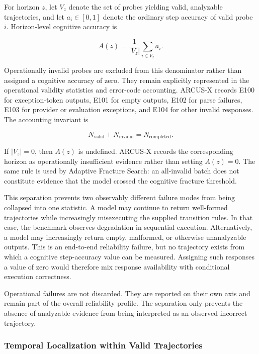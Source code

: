 \documentclass{article}
\begin{document}
For horizon $z$, let $V_z$ denote the set of probes yielding valid,
analyzable trajectories, and let $a_i \in [0,1]$ denote the ordinary step
accuracy of valid probe $i$. Horizon-level cognitive accuracy is

\begin{equation}
    A(z)
    =
    \frac{1}{|V_z|}
    \sum_{i \in V_z} a_i.
    \label{eq:conditional_accuracy}
\end{equation}

Operationally invalid probes are excluded from this denominator rather than
assigned a cognitive accuracy of zero. They remain explicitly represented in
the operational validity statistics and error-code accounting. ARCUS-X records
E100 for exception-token outputs, E101 for empty outputs, E102 for parse
failures, E103 for provider or evaluation exceptions, and E104 for other
invalid responses. The accounting invariant is

\begin{equation}
    N_{\mathrm{valid}} + N_{\mathrm{invalid}}
    =
    N_{\mathrm{completed}}.
    \label{eq:validity_partition}
\end{equation}

If $|V_z|=0$, then $A(z)$ is undefined. ARCUS-X records the corresponding
horizon as operationally insufficient evidence rather than setting
$A(z)=0$. The same rule is used by Adaptive Fracture Search: an all-invalid
batch does not constitute evidence that the model crossed the cognitive
fracture threshold.

This separation prevents two observably different failure modes from being
collapsed into one statistic. A model may continue to return well-formed
trajectories while increasingly misexecuting the supplied transition rules. In
that case, the benchmark observes degradation in sequential execution.
Alternatively, a model may increasingly return empty, malformed, or otherwise
unanalyzable outputs. This is an end-to-end reliability failure, but no
trajectory exists from which a cognitive step-accuracy value can be measured.
Assigning such responses a value of zero would therefore mix response
availability with conditional execution correctness.

Operational failures are not discarded. They are reported on their own axis
and remain part of the overall reliability profile. The separation only
prevents the absence of analyzable evidence from being interpreted as an
observed incorrect trajectory.

\subsubsection{Temporal Localization within Valid Trajectories}
\label{app:temporal_localization}
\end{document}
